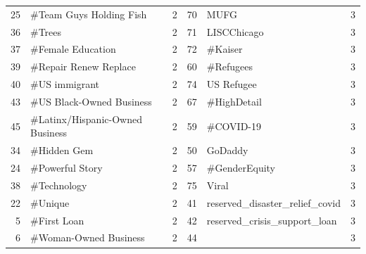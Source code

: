 \begin{longtable}{|r|l|l|r|l|l|}
	25          & \#Team Guys Holding Fish         & 2                                 & 70          & MUFG                              & 3                                 \\
	36          & \#Trees                          & 2                                 & 71          & LISCChicago                       & 3                                 \\
	37          & \#Female Education               & 2                                 & 72          & \#Kaiser                          & 3                                 \\
	39          & \#Repair Renew Replace           & 2                                 & 60          & \#Refugees                        & 3                                 \\
	40          & \#US immigrant                   & 2                                 & 74          & US Refugee                        & 3                                 \\
	43          & \#US Black-Owned Business        & 2                                 & 67          & \#HighDetail                      & 3                                 \\
	45          & \#Latinx/Hispanic-Owned Business & 2                                 & 59          & \#COVID-19                        & 3                                 \\
	34          & \#Hidden Gem                     & 2                                 & 50          & GoDaddy                           & 3                                 \\
	24          & \#Powerful Story                 & 2                                 & 57          & \#GenderEquity                    & 3                                 \\
	38          & \#Technology                     & 2                                 & 75          & Viral                             & 3                                 \\
	22          & \#Unique                         & 2                                 & 41          & reserved\_disaster\_relief\_covid & 3                                 \\
	5           & \#First Loan                     & 2                                 & 42          & reserved\_crisis\_support\_loan   & 3                                 \\
	6           & \#Woman-Owned Business           & 2                                 & 44          &                                   & 3                                 \\

\end{longtable}
